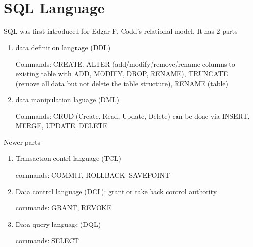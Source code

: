 \chapter{SQL Language}
\label{chap:SQL_lang}


SQL was first introduced for Edgar F. Codd's relational model. It has 2 parts
\begin{enumerate}
  \item data definition language (DDL)
  
  Commands: CREATE, ALTER (add/modify/remove/rename columns to existing table
  with ADD, MODIFY, DROP, RENAME), TRUNCATE (remove all data but not delete the
  table structure), RENAME (table)
  
  \item data manipulation laguage (DML)
  
  Commands: CRUD (Create, Read, Update, Delete) can be done via INSERT, MERGE,
  UPDATE, DELETE
\end{enumerate}
Newer parts
\begin{enumerate}
  \item Transaction contrl language (TCL)
  
  commands: COMMIT, ROLLBACK, SAVEPOINT
  
  \item Data control language (DCL): grant or take back control authority
  
  commands: GRANT, REVOKE
  
  \item Data query language (DQL)
  
  commands: SELECT
\end{enumerate}

